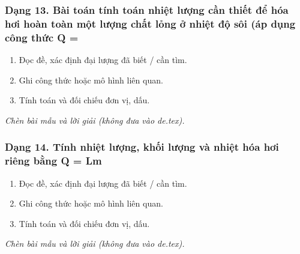 \subsubsection{Dạng 13. Bài toán tính toán nhiệt lượng cần thiết để hóa hơi hoàn toàn một lượng chất lỏng ở nhiệt độ sôi (áp dụng công thức Q =}
\begin{phuongphap}
\begin{enumerate}
\item Đọc đề, xác định đại lượng đã biết / cần tìm.
\item Ghi công thức hoặc mô hình liên quan.
\item Tính toán và đối chiếu đơn vị, dấu.
\end{enumerate}
\end{phuongphap}
\begin{vidumau}
\textit{Chèn bài mẫu và lời giải (không đưa vào de.tex).}
\end{vidumau}

\subsubsection{Dạng 14. Tính nhiệt lượng, khối lượng và nhiệt hóa hơi riêng bằng Q = Lm}
\begin{phuongphap}
\begin{enumerate}
\item Đọc đề, xác định đại lượng đã biết / cần tìm.
\item Ghi công thức hoặc mô hình liên quan.
\item Tính toán và đối chiếu đơn vị, dấu.
\end{enumerate}
\end{phuongphap}
\begin{vidumau}
\textit{Chèn bài mẫu và lời giải (không đưa vào de.tex).}
\end{vidumau}

